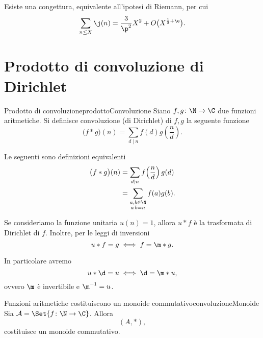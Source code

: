 \begin{oss}
	Esiste una congettura, equivalente all'ipotesi di Riemann, per cui
	\[
		\sum_{n\le X}\j(n)=\frac{3}{\p^2}X^2+O \big( X^{\frac{1}{2}+\e} \big).
	\]
\end{oss}
\section{Prodotto di convoluzione di Dirichlet}

\begin{defn}{Prodotto di convoluzione}{prodottoConvoluzione}
	Siano \(f,g\colon\N\to\C\) due funzioni aritmetiche.
	Si definisce convoluzione (di Dirichlet) di \(f,g\) la seguente funzione
	\[
		\big( f*g \big)(n)=\sum_{d\mid n}f(d) g\!\left( \frac{n}{d} \right).
	\]
\end{defn}

\begin{oss}
	Le seguenti sono definizioni equivalenti
	\[
		\begin{split}
			\big( f*g \big)(n) & =\sum_{d\mid n}f\!\left( \frac{n}{d} \right)g(d)\\
			& =\sum_{\substack{a,b\in\N\\a\,b=n}}f(a)g(b).
		\end{split}
	\]
\end{oss}

\begin{ese}
	Se consideriamo la funzione unitaria \(u(n)=1\), allora \(u*f\) è la trasformata di Dirichlet di \(f\).
	Inoltre, per le leggi di inversioni
	\[
		u*f=g \iff f=\m*g.
	\]
\end{ese}

\begin{oss}
	In particolare avremo
	\[
		u * \d = u \iff \d = \m * u,
	\]
	ovvero \(\m\) è invertibile e \(\m^{-1}=u\).
\end{oss}

\begin{prop}{Funzioni aritmetiche costituiscono un monoide commutativo}{convoluzioneMonoide}
	Sia \(\mathcal{A}=\Set{f\colon\N\to \C}\).
	Allora
	\[
		(A,*),
	\]
	costituisce un monoide commutativo.
\end{prop}

